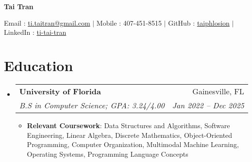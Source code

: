 \documentclass[letterpaper,11pt]{article}
\makeatletter
\newcommand{\resumeItem}[2]{
  \item\small{
    \textbf{#1}{: #2 \vspace{-2pt}}
  }
}
\newcommand{\resumeItemExperience}[1]{
  \item\small{
    {#1 \vspace{-2pt}}
  }
}
\newcommand{\resumeSubheading}[4]{
  \vspace{-1pt}\item
    \begin{tabular*}{0.97\textwidth}{l@{\extracolsep{\fill}}r}
      \textbf{#1} & #2 \\
      \textit{\small#3} & \textit{\small #4} \\
    \end{tabular*}\vspace{-6pt}
}
\newcommand{\resumeSubHeadingListStart}{\begin{itemize}[leftmargin=*, label={}]}
\newcommand{\resumeSubHeadingListEnd}{\end{itemize}}
\newcommand{\resumeItemListStart}{\begin{itemize}}
\newcommand{\resumeItemListEnd}{\end{itemize}\vspace{-5pt}}
\makeatother
\begin{document}
    \centerline{\textbf{\huge Tai Tran}}\vspace{0.15cm}
    \centerline{Email : \href{mailto:}{ti.taitran@gmail.com} $|$
    Mobile : 407-451-8515 $|$
    GitHub : \href{https://github.com/taiphlosion}{taiphlosion} $|$
    LinkedIn : \href{https://www.linkedin.com/in/ti-tai-tran/}{ti-tai-tran}}

\section{Education}
  \resumeSubHeadingListStart
    \resumeSubheading
      {University of Florida}{Gainesville, FL}
      {B.S in Computer Science; GPA: 3.24/4.00}{Jan 2022 -- Dec 2025}
    \resumeItemListStart
        \resumeItem{Relevant Coursework}
            {Data Structures and Algorithms, 
            Software Engineering, 
            Linear Algebra, 
            Discrete Mathematics, 
            Object-Oriented Programming, 
            Computer Organization,
            Multimodal Machine Learning,
            Operating Systems, 
            Programming Language Concepts
            }
    \resumeItemListEnd
  \resumeSubHeadingListEnd


\end{document}

